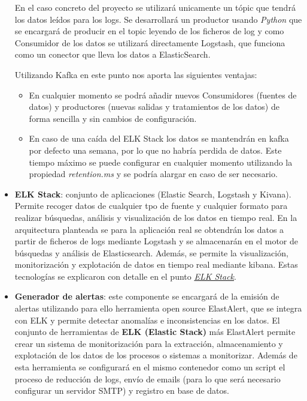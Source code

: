 \begin{itemize}
En el caso concreto del proyecto se utilizará unicamente un tópic que tendrá los datos leídos para los logs. Se desarrollará un productor usando \textit{Python} que se encargará de producir en el topic leyendo de los ficheros de log y como Consumidor de los datos se utilizará directamente Logstash, que funciona como un conector que lleva los datos a ElasticSearch.

Utilizando Kafka en este punto nos aporta las siguientes ventajas:

\begin{itemize}
\item En cualquier momento se podrá añadir nuevos Consumidores (fuentes de datos) y productores (nuevas salidas y tratamientos de los datos) de forma sencilla y sin cambios de configuración.
\item En caso de una caída del ELK Stack los datos se mantendrán en kafka por defecto una semana, por lo que no habría perdida de datos. Este tiempo máximo se puede configurar en cualquier momento utilizando la propiedad \textit{retention.ms} y se podría alargar en caso de ser necesario.
\end{itemize}

\item \textbf{ELK Stack}: conjunto de aplicaciones (Elastic Search, Logstash y Kivana). Permite recoger datos de cualquier tpo de fuente y cualquier formato para realizar búsquedas, análisis y visualización de los datos en tiempo real. En la arquitectura planteada se para la aplicación real se obtendrán los datos a partir de ficheros de logs mediante Logstash y se almacenarán en el motor de búsquedas y análisis de Elasticsearch. Además, se permite la visualización, monitorización y explotación de datos en tiempo real mediante kibana. Estas tecnologías se explicaron con detalle en el punto \hyperref[sec:elk_stack]{\textit{ELK Stack}}.

\item \textbf{Generador de alertas}: este componente se encargará de la emisión de alertas utilizando para ello herramienta open source ElastAlert, que se integra con ELK y permite detectar anomalías e inconsistencias en los datos. El conjunto de herramientas de \textbf{ELK (Elastic Stack)} más ElastAlert permite crear un sistema de monitorización para la extracción, almacenamiento y explotación de los datos de los procesos o sistemas a monitorizar. Además de esta herramienta se configurará en el mismo contenedor como un script el proceso de reducción de logs, envío de emails (para lo que será necesario configurar un servidor SMTP) y registro en base de datos. 

\end{itemize}

